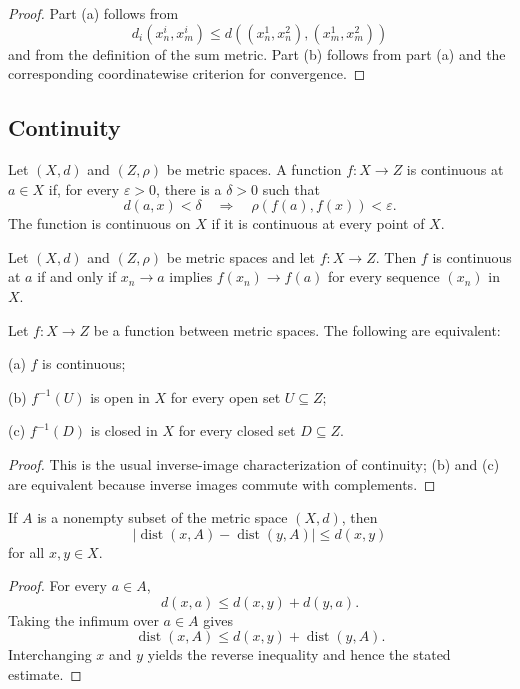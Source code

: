 \begin{proof}
Part (a) follows from
\[
d_i(x_n^i,x_m^i)\leq d((x_n^1,x_n^2),(x_m^1,x_m^2))
\]
and from the definition of the sum metric. Part (b) follows from part (a) and
the corresponding coordinatewise criterion for convergence.
\end{proof}

\subsection{Continuity}

\begin{de}
Let $(X,d)$ and $(Z,\rho)$ be metric spaces. A function $f:X\to Z$ is
continuous at $a\in X$ if, for every $\varepsilon>0$, there is a $\delta>0$
such that
\[
d(a,x)<\delta\quad\Longrightarrow\quad
\rho(f(a),f(x))<\varepsilon.
\]
The function is continuous on $X$ if it is continuous at every point of $X$.
\end{de}

\begin{thm}
Let $(X,d)$ and $(Z,\rho)$ be metric spaces and let $f:X\to Z$. Then $f$ is
continuous at $a$ if and only if $x_n\to a$ implies
$f(x_n)\to f(a)$ for every sequence $(x_n)$ in $X$.
\end{thm}

\begin{thm}
Let $f:X\to Z$ be a function between metric spaces. The following are
equivalent:

(a) $f$ is continuous;

(b) $f^{-1}(U)$ is open in $X$ for every open set $U\subseteq Z$;

(c) $f^{-1}(D)$ is closed in $X$ for every closed set $D\subseteq Z$.
\end{thm}

\begin{proof}
This is the usual inverse-image characterization of continuity; (b) and (c)
are equivalent because inverse images commute with complements.
\end{proof}

\begin{thm}
If $A$ is a nonempty subset of the metric space $(X,d)$, then
\[
\bigl|\operatorname{dist}(x,A)-\operatorname{dist}(y,A)\bigr|
\leq d(x,y)
\]
for all $x,y\in X$.
\end{thm}

\begin{proof}
For every $a\in A$,
\[
d(x,a)\leq d(x,y)+d(y,a).
\]
Taking the infimum over $a\in A$ gives
\[
\operatorname{dist}(x,A)
\leq d(x,y)+\operatorname{dist}(y,A).
\]
Interchanging $x$ and $y$ yields the reverse inequality and hence the stated
estimate.
\end{proof}

